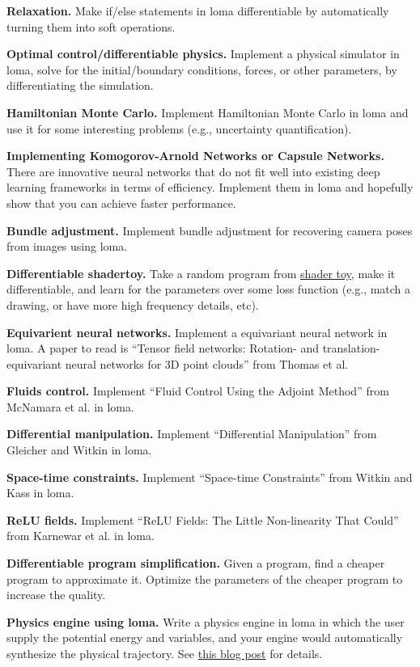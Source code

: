 \textbf{Relaxation.} Make if/else statements in loma differentiable by automatically turning them into soft operations.

\textbf{Optimal control/differentiable physics.} Implement a physical simulator in loma, solve for the initial/boundary conditions, forces, or other parameters, by differentiating the simulation. 

\textbf{Hamiltonian Monte Carlo.} Implement Hamiltonian Monte Carlo in loma and use it for some interesting problems (e.g., uncertainty quantification).

\textbf{Implementing Komogorov-Arnold Networks or Capsule Networks.} There are innovative neural networks that do not fit well into existing deep learning frameworks in terms of efficiency. Implement them in loma and hopefully show that you can achieve faster performance.  

\textbf{Bundle adjustment.} Implement bundle adjustment for recovering camera poses from images using loma.

\textbf{Differentiable shadertoy.} Take a random program from \href{https://www.shadertoy.com/}{shader toy}, make it differentiable, and learn for the parameters over some loss function (e.g., match a drawing, or have more high frequency details, etc).

\textbf{Equivarient neural networks.} Implement a equivariant neural network in loma. A paper to read is ``Tensor field networks: Rotation- and translation-equivariant neural networks for 3D point clouds'' from Thomas et al.

\textbf{Fluids control.} Implement ``Fluid Control Using the Adjoint Method'' from McNamara et al. in loma.

\textbf{Differential manipulation.} Implement ``Differential Manipulation'' from Gleicher and Witkin in loma.

\textbf{Space-time constraints.} Implement ``Space-time Constraints'' from Witkin and Kass in loma.

\textbf{ReLU fields.} Implement ``ReLU Fields: The Little Non-linearity That Could'' from Karnewar et al. in loma.

\textbf{Differentiable program simplification.} Given a program, find a cheaper program to approximate it. Optimize the parameters of the cheaper program to increase the quality.

\textbf{Physics engine using loma.} Write a physics engine in loma in which the user supply the potential energy and variables, and your engine would automatically synthesize the physical trajectory. See \href{https://blog.jle.im/entry/hamiltonian-dynamics-in-haskell.html}{this blog post} for details.


